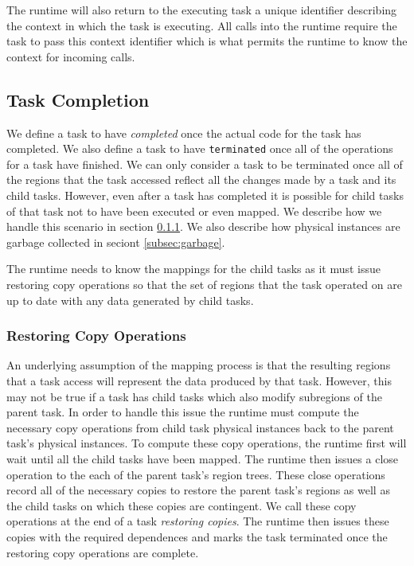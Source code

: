 The runtime will also return to the executing task a unique identifier describing the
context in which the task is executing.  All calls into the runtime require the task
to pass this context identifier which is what permits the runtime to know the context
for incoming calls.  

\subsection{Task Completion}
\label{subsec:cleanup}
We define a task to have {\em completed} once the actual code for the task has completed.
We also define a task to have {\tt terminated} once all of the operations for a task
have finished.  We can only consider a task to be terminated once all of the regions that
the task accessed reflect all the changes made by a task and its child tasks.  However,
even after a task has completed it is possible for child tasks of that task
not to have been executed or even mapped.  We describe how we handle this scenario in
section \ref{subsec:restore}.  We also describe how physical instances are garbage
collected in seciont \ref{subsec:garbage}.

The runtime needs to know the mappings for
the child tasks as it must issue restoring copy operations so that the set of regions
that the task operated on are up to date with any data generated by child tasks.  

\subsubsection{Restoring Copy Operations}
\label{subsec:restore}
An underlying assumption of the mapping process is that the resulting regions that
a task access will represent the data produced by that task.  However, this may not
be true if a task has child tasks which also modify subregions of the parent task.
In order to handle this issue the runtime must compute the necessary copy operations
from child task physical instances back to the parent task's physical instances.  To
compute these copy operations, the runtime first will wait until all the child tasks
have been mapped.  The runtime then issues a close operation to the each of the parent
task's region trees.  These close operations record all of the necessary copies to
restore the parent task's regions as well as the child tasks on which these copies
are contingent.  We call these copy operations at the end of a task {\em restoring copies}.
The runtime then issues these copies with the required dependences
and marks the task terminated once the restoring copy operations are complete.


